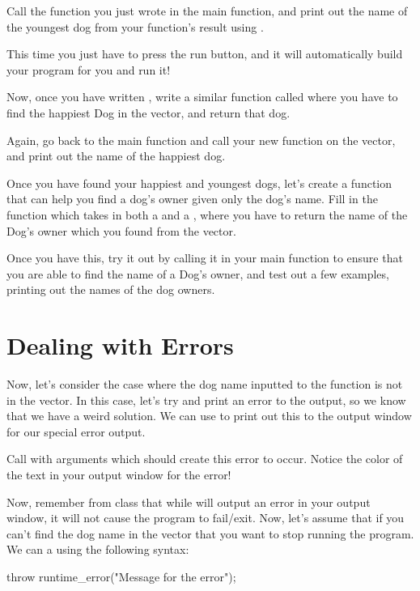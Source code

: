 \documentclass{tufte-handout}
\begin{document}
Call the function you just wrote in the main function, and print out the name of the youngest dog from your function's result using .  

This time you just have to press the run button, and it will automatically build your program for you and run it!

Now, once you have written , write a similar function called  where you have to find the happiest Dog in the vector, and return that dog.

Again, go back to the main function and call your new function on the  vector, and print out the name of the happiest dog.

Once you have found your happiest and youngest dogs, let's create a function that can help you find a dog's owner given only the dog's name.  Fill in the function  which takes in both a  and a , where you have to return the name of the Dog's owner which you found from the vector.

Once you have this, try it out by calling it in your main function to ensure that you are able to find the name of a Dog's owner, and test out a few examples, printing out the names of the dog owners.

\section{Dealing with Errors}

Now, let's consider the case where the dog name inputted to the  function is not in the  vector.%
 In this case, let's try and print an error to the output, so we know that we have a weird solution.  We can use  to print out this to the output window for our special error output.  

Call  with arguments which should create this error to occur.  
Notice the color of the text in your output window for the error!  

Now, remember from class that while  will output an error in your output window, it will not cause the program to fail/exit.  
Now, let's assume that if you can't find the dog name in the  vector that you want to stop running the program.  
We can  a  using the following syntax: 
\begin{Code}
throw runtime_error("Message for the error");
\end{Code}
\end{document}
